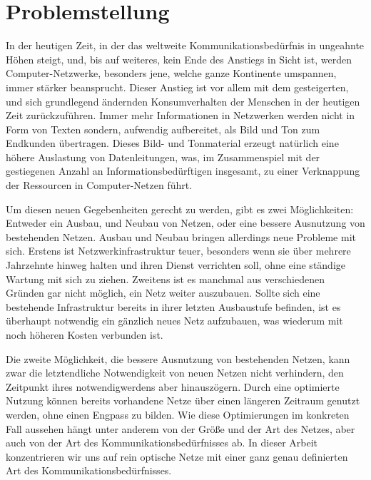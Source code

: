 \chapter{Problemstellung}
In der heutigen Zeit, in der das weltweite Kommunikationsbedürfnis in ungeahnte Höhen steigt, und, bis auf weiteres, kein Ende des Anstiegs in Sicht ist, werden
Computer-Netzwerke, besonders jene, welche ganze Kontinente umspannen, immer stärker beansprucht. Dieser Anstieg ist vor allem mit dem gesteigerten, und sich
grundlegend ändernden Konsumverhalten der Menschen in der heutigen Zeit zurückzuführen. Immer mehr Informationen in Netzwerken werden nicht in Form von Texten
sondern, aufwendig aufbereitet, als Bild und Ton zum Endkunden übertragen. Dieses Bild- und Tonmaterial erzeugt natürlich eine höhere Auslastung von Datenleitungen,
was, im Zusammenspiel mit der gestiegenen Anzahl an Informationsbedürftigen insgesamt, zu einer Verknappung der Ressourcen in Computer-Netzen führt.

Um diesen neuen Gegebenheiten gerecht zu werden, gibt es zwei Möglichkeiten: Entweder ein Ausbau, und Neubau von Netzen, oder eine bessere Ausnutzung von bestehenden
Netzen. Ausbau und Neubau bringen allerdings neue Probleme mit sich. Erstens ist Netzwerkinfrastruktur teuer, besonders wenn sie über mehrere Jahrzehnte hinweg
halten und ihren Dienst verrichten soll, ohne eine ständige Wartung mit sich zu ziehen. Zweitens ist es manchmal aus verschiedenen Gründen gar nicht möglich, 
ein Netz weiter auszubauen. Sollte sich eine bestehende Infrastruktur bereits in ihrer letzten Ausbaustufe befinden, ist es überhaupt notwendig ein gänzlich
neues Netz aufzubauen, was wiederum mit noch höheren Kosten verbunden ist.

Die zweite Möglichkeit, die bessere Ausnutzung von bestehenden Netzen, kann zwar die letztendliche Notwendigkeit von neuen Netzen nicht verhindern, den Zeitpunkt
ihres notwendigwerdens aber hinauszögern. Durch eine optimierte Nutzung können bereits vorhandene Netze über einen längeren Zeitraum genutzt werden, ohne einen
Engpass zu bilden. Wie diese Optimierungen im konkreten Fall aussehen hängt unter anderem von der Größe und der Art des Netzes, aber auch von der Art des
Kommunikationsbedürfnisses ab. In dieser Arbeit konzentrieren wir uns auf rein optische Netze mit einer ganz genau definierten Art des Kommunikationsbedürfnisses.

